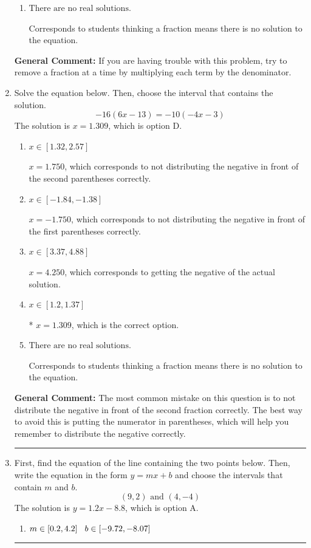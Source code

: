 \documentclass{extbook}[14pt]
\newcommand{\litem}[1]{\item #1

\rule{\textwidth}{0.4pt}}
\begin{document}
\begin{enumerate}
{\begin{enumerate}[label=\Alph*.]
 $x = 10.519$, which corresponds to not distributing the negative in front of the second fraction.
\item \( \text{There are no real solutions.} \)

Corresponds to students thinking a fraction means there is no solution to the equation.
\end{enumerate}

\textbf{General Comment:} If you are having trouble with this problem, try to remove a fraction at a time by multiplying each term by the denominator.
}
\litem{
Solve the equation below. Then, choose the interval that contains the solution.
\[ -16(6x -13) = -10(-4x -3) \]The solution is \( x = 1.309 \), which is option D.\begin{enumerate}[label=\Alph*.]
\item \( x \in [1.32, 2.57] \)

$x = 1.750$, which corresponds to not distributing the negative in front of the second parentheses correctly.
\item \( x \in [-1.84, -1.38] \)

$x = -1.750$, which corresponds to not distributing the negative in front of the first parentheses correctly.
\item \( x \in [3.37, 4.88] \)

$x = 4.250$, which corresponds to getting the negative of the actual solution.
\item \( x \in [1.2, 1.37] \)

* $x = 1.309$, which is the correct option.
\item \( \text{There are no real solutions.} \)

Corresponds to students thinking a fraction means there is no solution to the equation.
\end{enumerate}

\textbf{General Comment:} The most common mistake on this question is to not distribute the negative in front of the second fraction correctly. The best way to avoid this is putting the numerator in parentheses, which will help you remember to distribute the negative correctly.
}
\litem{
First, find the equation of the line containing the two points below. Then, write the equation in the form $ y=mx+b $ and choose the intervals that contain $m$ and $b$.
\[ (9, 2) \text{ and } (4, -4) \]The solution is \( y = 1.2x -8.8 \), which is option A.\begin{enumerate}[label=\Alph*.]
\item \( m \in [0.2, 4.2] \hspace*{3mm} b \in [-9.72, -8.07] \)


\end{enumerate}}
\end{enumerate}
\end{document}
